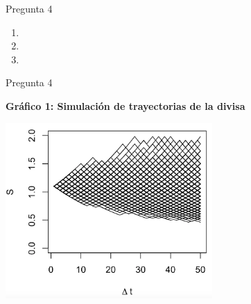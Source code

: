 \documentclass{beamer}
\begin{document}
\begin{frame}{Pregunta 4}
\justify
\Pregcuatro
\vspace{1em}

\begin{enumerate}[label=\textbf{\alph*)}]
\item \Pregcuatroa
\item \Pregcuatrob
\item \Pregcuatroc
\end{enumerate}

\end{frame}
\begin{frame}{Pregunta 4}

\centering
\textbf{Gráfico 1: Simulación de trayectorias de la divisa}

  \includegraphics[height=18em]{../imagenes/Imagen 1.png}
\end{frame}
\end{document}
